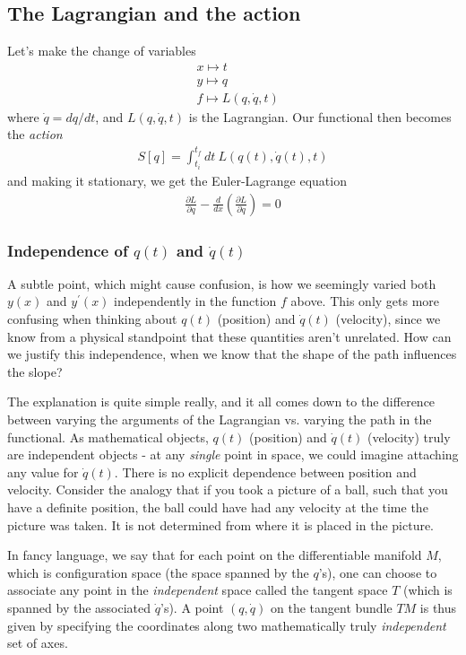 \documentclass[a4paper]{article}
\begin{document}
    \subsection{The Lagrangian and the action}
    Let's make the change of variables \begin{align*}
        &x \mapsto t\\
        &y \mapsto q\\
        &f \mapsto L(q, \dot{q}, t)
    \end{align*}
    where \(\dot{q} = dq / dt\), and \(L(q, \dot{q}, t)\) is the Lagrangian. Our functional then becomes the \textit{action} \begin{align*}
        S[q] = \int_{t_i}^{t_f} dt\ L(q(t), \dot{q} (t), t)
    \end{align*} and making it stationary, we get the Euler-Lagrange equation \begin{align*}
        \frac{\partial L}{\partial q}- \frac{d}{dx}\left( \frac{\partial L}{\partial \dot{q}}\right) = 0
    \end{align*} 

    \subsubsection{Independence of \(q(t)\) and \(\dot{q}(t)\)}
    A subtle point, which might cause confusion, is how we seemingly varied both \(y(x)\) and \(y^{\prime}(x)\) independently in the function \(f\) above. This only gets more confusing when thinking about \(q(t)\) (position) and \(\dot{q} (t)\) (velocity), since we know from a physical standpoint that these quantities aren't unrelated. How can we justify this independence, when we know that the shape of the path influences the slope?

    The explanation is quite simple really, and it all comes down to the difference between varying the arguments of the Lagrangian vs. varying the path in the functional. As mathematical objects, \(q(t)\) (position) and \(\dot{q} (t)\) (velocity) truly are independent objects - at any \textit{single} point in space, we could imagine attaching any value for \(\dot{q}(t)\). There is no explicit dependence between position and velocity. Consider the analogy that if you took a picture of a ball, such that you have a definite position, the ball could have had any velocity at the time the picture was taken. It is not determined from where it is placed in the picture.
    
    In fancy language, we say that for each point on the differentiable manifold \(M\), which is configuration space (the space spanned by the \(q\)'s), one can choose to associate any point in the \textit{independent} space called the tangent space \(T\) (which is spanned by the associated \(\dot{q}\)'s). A point \((q, \dot{q})\) on the tangent bundle \(TM\) is thus given by specifying the coordinates along two mathematically truly \textit{independent} set of axes.
    
\end{document}
